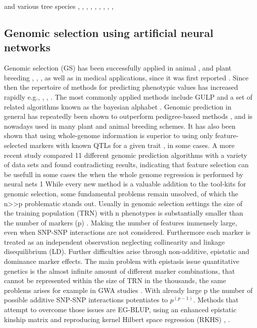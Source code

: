 and various tree species \cite{deAlmeidaFilho2019,}, \cite{Rincent_2018}, \cite{Kainer_2018}, \cite{Ratcliffe_2017},
\cite{GamalElDien_2016},
\cite{Kumar_2015}, \cite{Jaramillo_Correa_2014}, \cite{Zapata_Valenzuela_2013}, \cite{Holliday_2012}, \cite{Resende_2012}


\subsection{Genomic selection using artificial neural networks }
Genomic selection (GS) has been successfully applied in animal \cite{gianola2015one}, \cite{hayes2010genome}
and plant breeding \cite{crossa2010}, \cite{desta2014genomic}, \cite{heffner2010plant}, \cite{crossa2017genomic}
as well as in medical applications, since it was first reported  \cite{hayes2001}. Since then the repertoire of
methods for predicting phenotypic values has increased rapidly e.g.\cite{dlc2009}, \cite{habier2011}, \cite{gianola2013} ,
\cite{crossa2017}. The most commonly applied methods include GULP and a set of related algorithms known as the bayesian alphabet
\cite{gianola2009}. 
Genomic prediction in general has repeatedly been shown to outperform pedigree-based methods \cite{crossa2010},
\cite{albrecht2011} and is nowadays used in many plant and animal breeding schemes. 
It has also been shown that using whole-genome information is superior to using only feature-selected markers
with known QTLs for a given trait \cite{bernardo2007}, \cite{heffner2011} in some cases. A more recent study
\cite{azodi2019} compared 11 different genomic prediction algorithms with a variety of data sets and found
contradicting results, indicating that feature selection can be usefull in some cases the when the whole
genome regression is performed by neural nets 1
While every new method is a valuable addition to the tool-kits for genomic selection, some fundamental
problems remain unsolved, of which the n>>p problematic stands out. Usually in genomic selection settings
the size of the training population (TRN) with n phenotypes is substantially smaller than the number of
markers (p) \cite{fan2014challenges}. Making the number of features immensely large,  even when SNP-SNP
interactions are not considered.  Furthermore each marker is treated as an independent observation
neglecting collinearity and linkage disequilibrium (LD). 
Further difficulties arise through non-additive, epistatic and dominance marker effects. The main problem
with epistasis issue quantitative genetics is the almost infinite amount of different marker combinations,
that cannot be represented within the size of TRN in the thousands, the same problems arises for example
in GWA studies \cite{korte2013advantages}. With already large p the number of possible additive SNP-SNP interactions
potentiates to $p^{(p-1)}$. Methods that attempt to overcome those issues are EG-BLUP, using an enhanced
epistatic kinship matrix and reproducing kernel Hilbert space regression (RKHS) \cite{jiang2015}, \cite{martini2017genomic}.

